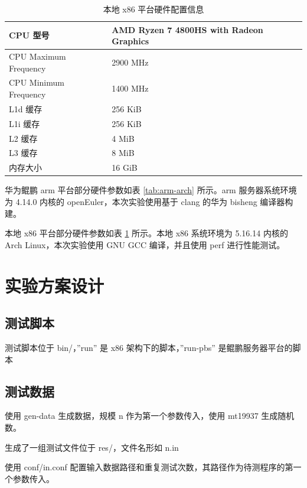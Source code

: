 \documentclass[a4paper]{article}
\begin{document}
\begin{table}[]
  \centering
  \begin{tabular}{ll}
    \hline
    CPU 型号              & AMD Ryzen 7 4800HS with Radeon Graphics \\   \hline
    CPU Maximum Frequency & 2900 MHz                                \\   \hline
    CPU Minimum Frequency & 1400 MHz                                \\   \hline
    L1d 缓存              & 256 KiB                                 \\   \hline
    L1i 缓存              & 256 KiB                                 \\   \hline
    L2 缓存               & 4 MiB                                   \\   \hline
    L3 缓存               & 8 MiB                                   \\   \hline
    内存大小              & 16 GiB                                  \\   \hline
  \end{tabular}
  \caption{本地 x86 平台硬件配置信息}
  \label{tab:x86-arch}
\end{table}

华为鲲鹏 arm 平台部分硬件参数如表 \ref{tab:arm-arch} 所示。arm 服务器系统环境为 4.14.0 内核的 openEuler，本次实验使用基于 clang 的华为 bisheng 编译器构建。

本地 x86 平台部分硬件参数如表 \ref{tab:x86-arch} 所示。本地 x86 系统环境为 5.16.14 内核的 Arch Linux，本次实验使用 GNU GCC 编译，并且使用 perf 进行性能测试。

\section{实验方案设计}
\subsection{测试脚本}
测试脚本位于 bin/，''run'' 是 x86 架构下的脚本，''run-pbs'' 是鲲鹏服务器平台的脚本

\subsection{测试数据}
使用 gen-data 生成数据，规模 n 作为第一个参数传入，使用 mt19937 生成随机数。

生成了一组测试文件位于 res/，文件名形如 n.in

使用 conf/in.conf 配置输入数据路径和重复测试次数，其路径作为待测程序的第一个参数传入。
\end{document}
